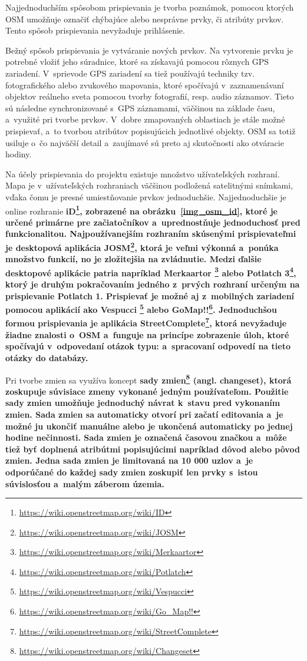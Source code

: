 Najjednoduchším spôsobom prispievania je tvorba poznámok, pomocou ktorých OSM umožňuje označiť chýbajúce alebo nesprávne prvky, či atribúty prvkov. Tento spôsob prispievania nevyžaduje prihlásenie.

Bežný spôsob prispievania je vytváranie nových prvkov. Na vytvorenie prvku je potrebné vložiť jeho súradnice, ktoré sa získavajú pomocou rôznych GPS zariadení. V~sprievode GPS zariadení sa tiež používajú techniky tzv. fotografického alebo zvukového mapovania, ktoré spočívajú v~zaznamenávaní objektov reálneho sveta pomocou tvorby fotografií, resp. audio záznamov. Tieto sú následne synchronizované s~GPS záznamami, väčšinou na základe času, a~využité pri tvorbe prvkov. V~dobre zmapovaných oblastiach je stále možné prispievať, a~to tvorbou atribútov popisujúcich jednotlivé objekty. OSM sa totiž usiluje o~čo najväčší detail a~zaujímavé sú preto aj skutočnosti ako otváracie hodiny. 

Na účely prispievania do projektu existuje množstvo užívateľských rozhraní. Mapa je v~užívateľských rozhraniach väčšinou podložená satelitnými snímkami, vďaka čomu je presné umiestňovanie prvkov jednoduchšie. Najjednoduchšie je online rozhranie \bf iD\rm\footnote{\url{https://wiki.openstreetmap.org/wiki/ID}}, zobrazené na obrázku~\ref{img_osm_id}, ktoré je určené primárne pre začiatočníkov a~uprednostňuje jednoduchosť pred funkcionalitou. Najpoužívanejším rozhraním skúsenými prispievateľmi je desktopová aplikácia \bf JOSM\rm\footnote{\url{https://wiki.openstreetmap.org/wiki/JOSM}}, ktorá je veľmi výkonná a~ponúka množstvo funkcií, no je zložitejšia na zvládnutie. Medzi ďalšie desktopové aplikácie patria napríklad \bf Merkaartor \rm\footnote{\url{https://wiki.openstreetmap.org/wiki/Merkaartor}} alebo \bf Potlatch 3\rm\footnote{\url{https://wiki.openstreetmap.org/wiki/Potlatch}}, ktorý je druhým pokračovaním jedného z~prvých rozhraní určeným na prispievanie Potlatch 1. Prispievať je možné aj z~mobilných zariadení pomocou aplikácií ako \bf Vespucci \rm\footnote{\url{https://wiki.openstreetmap.org/wiki/Vespucci}} alebo \bf GoMap!!\rm\footnote{\url{https://wiki.openstreetmap.org/wiki/Go_Map!!}}. Jednoduchšou formou prispievania je aplikácia \bf StreetComplete\rm\footnote{\url{https://wiki.openstreetmap.org/wiki/StreetComplete}}, ktorá nevyžaduje žiadne znalosti o~OSM a~funguje na princípe zobrazenie úloh, ktoré spočívajú v~odpovedaní otázok typu: {\it {}} a~spracovaní odpovedí na tieto otázky do databázy.

Pri tvorbe zmien sa využíva koncept \bf sady zmien\rm\footnote{\url{https://wiki.openstreetmap.org/wiki/Changeset}} (angl. changeset), ktorá zoskupuje súvisiace zmeny vykonané jedným používateľom. Použitie sady zmien umožňuje jednoduchý návrat k~stavu pred vykonaním zmien. Sada zmien sa automaticky otvorí pri začatí editovania a~je možné ju ukončiť manuálne alebo je ukončená automaticky po jednej hodine nečinnosti. Sada zmien je označená časovou značkou a~môže tiež byť doplnená atribútmi popisujúcimi napríklad dôvod alebo pôvod zmien. Jedna sada zmien je limitovaná na 10 000 uzlov a~je odporúčané do každej sady zmien zoskupiť len prvky s~istou súvislosťou a~malým záberom územia.


